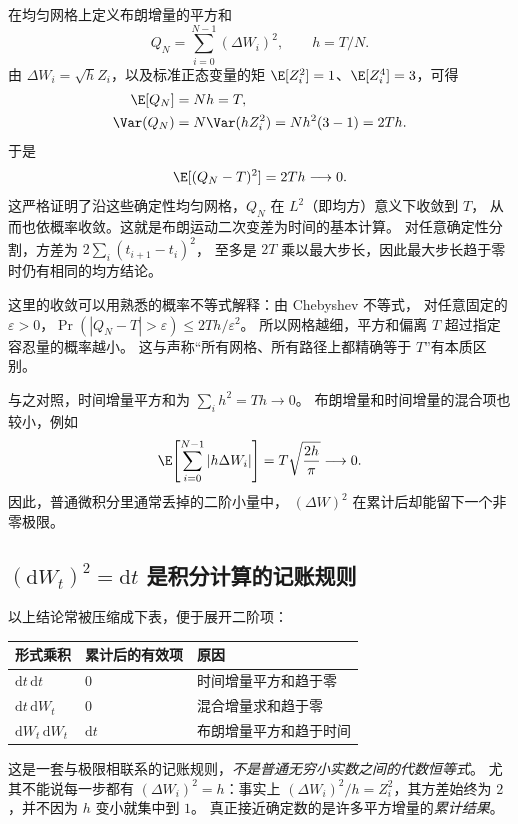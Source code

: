 在均匀网格上定义布朗增量的平方和
\begin{equation}
  Q_N=\sum_{i=0}^{N-1}(\Delta W_i)^2,
  \qquad h=T/N.
  \label{bg:eq:qv-sum}
\end{equation}
由 $\Delta W_i=\sqrt h Z_i$，以及标准正态变量的矩
$\E[Z_i^2]=1$、$\E[Z_i^4]=3$，可得
\begin{align}
  \E[Q_N]&=Nh=T,\label{bg:eq:qv-mean}\\
  \Var(Q_N)&=N\Var(hZ_i^2)
   =Nh^2(3-1)=2Th.\label{bg:eq:qv-variance}
\end{align}
于是
\begin{equation}
  \E[(Q_N-T)^2]=2Th\longrightarrow0.
  \label{bg:eq:qv-limit}
\end{equation}
这严格证明了沿这些确定性均匀网格，$Q_N$ 在 $L^2$（即均方）意义下收敛到 $T$，
从而也依概率收敛。这就是布朗运动二次变差为时间的基本计算。
对任意确定性分割，方差为 $2\sum_i(t_{i+1}-t_i)^2$，
至多是 $2T$ 乘以最大步长，因此最大步长趋于零时仍有相同的均方结论。

这里的收敛可以用熟悉的概率不等式解释：由 Chebyshev 不等式，
对任意固定的 $\varepsilon>0$，$\Pr(|Q_N-T|>\varepsilon)\leq 2Th/\varepsilon^2$。
所以网格越细，平方和偏离 $T$ 超过指定容忍量的概率越小。
这与声称“所有网格、所有路径上都精确等于 $T$”有本质区别。

与之对照，时间增量平方和为 $\sum_i h^2=Th\to0$。
布朗增量和时间增量的混合项也较小，例如
\begin{equation}
  \E\!\left[\sum_{i=0}^{N-1}|h\Delta W_i|\right]
  =T\sqrt{\frac{2h}{\pi}}\longrightarrow0.
  \label{bg:eq:mixed-increment}
\end{equation}
因此，普通微积分里通常丢掉的二阶小量中，
$(\Delta W)^2$ 在累计后却能留下一个非零极限。

\subsection{$(\mathrm dW_t)^2=\mathrm dt$ 是积分计算的记账规则}
\label{bg:sub:ito-table}

以上结论常被压缩成下表，便于展开二阶项：
\begin{center}
\begin{tabular}{lll}
\toprule
形式乘积 & 累计后的有效项 & 原因\\
\midrule
$\mathrm dt\,\mathrm dt$ & $0$ & 时间增量平方和趋于零\\
$\mathrm dt\,\mathrm dW_t$ & $0$ & 混合增量求和趋于零\\
$\mathrm dW_t\,\mathrm dW_t$ & $\mathrm dt$ & 布朗增量平方和趋于时间\\
\bottomrule
\end{tabular}
\end{center}
这是一套与极限相联系的记账规则，\emph{不是普通无穷小实数之间的代数恒等式}。
尤其不能说每一步都有 $(\Delta W_i)^2=h$：事实上
$(\Delta W_i)^2/h=Z_i^2$，其方差始终为 $2$，并不因为 $h$ 变小就集中到 $1$。
真正接近确定数的是许多平方增量的\emph{累计结果}。

